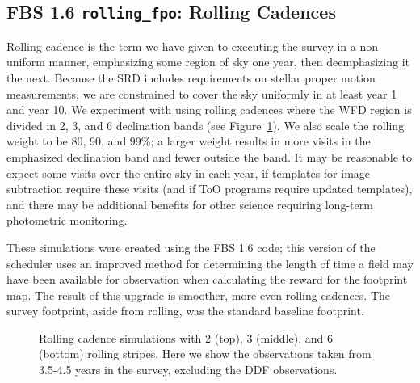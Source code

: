 \subsection{FBS 1.6 {\tt rolling\_fpo}: Rolling Cadences}\label{ss:rolling}

Rolling cadence is the term we have given to executing the survey in a non-uniform manner, emphasizing some region of sky one year, then deemphasizing it the next.  Because the SRD includes requirements on stellar proper motion measurements, we are constrained to cover the sky uniformly in at least year 1 and year 10.  We experiment with using rolling cadences where the WFD region is divided in 2, 3, and 6 declination bands (see Figure~\ref{fig:rollingstripes}). We also scale the rolling weight to be 80, 90, and 99\%; a larger weight results in more visits in the emphasized declination band and fewer outside the band. It may be reasonable to expect some visits over the entire sky in each year, if templates for image subtraction require these visits (and if ToO programs require updated templates), and there may be additional benefits for other science requiring long-term photometric monitoring. 

These simulations were created using the FBS 1.6 code; this version of the scheduler uses an improved method for determining the length of time a field may have been available for observation when calculating the reward for the footprint map. The result of this upgrade is smoother, more even rolling cadences. The survey footprint, aside from rolling, was the standard baseline footprint.

\begin{figure}
\caption{Rolling cadence simulations with 2 (top), 3 (middle), and 6 (bottom) rolling stripes. Here we show the observations taken from 3.5-4.5 years in the survey, excluding the DDF observations.} \label{fig:rollingstripes}
\end{figure}

